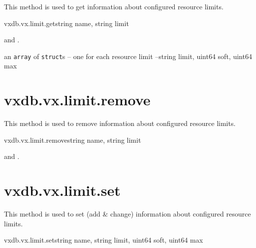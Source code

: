 This method is used to get information about configured resource limits.

\begin{rpcsynopsis}{vxdb.vx.limit.get}{string name, string limit}
\end{rpcsynopsis}

\begin{rpcaccess}
 and \rpcownerchecks.
\end{rpcaccess}

\begin{rpcreturncomplex}{an \texttt{array} of \texttt{struct}s -- one for each
	resource limit --}{string limit, uint64 soft, uint64 max}
\end{rpcreturncomplex}

\rpcnoerrors


\section{vxdb.vx.limit.remove}

This method is used to remove information about configured resource limits.

\begin{rpcsynopsis}{vxdb.vx.limit.remove}{string name, string limit}
\end{rpcsynopsis}

\begin{rpcaccess}
 and \rpcownerchecks.
\end{rpcaccess}

\rpcreturnnil

\rpcnoerrors


\section{vxdb.vx.limit.set}

This method is used to set (add \& change) information about configured
resource limits.

\begin{rpcsynopsis}{vxdb.vx.limit.set}{string name, string limit, uint64 soft,
	uint64 max}
\end{rpcsynopsis}

